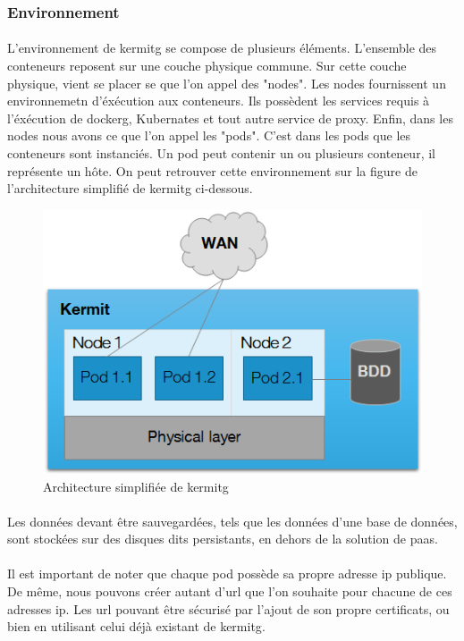 \documentclass[12pt,a4paper]{report}
\begin{document}
\subsubsection{Environnement}
\paragraph*{}L'environnement de \gls{kermitg} se compose de plusieurs éléments. L'ensemble des conteneurs reposent sur une couche physique commune. Sur cette couche physique, vient se placer se que l'on appel des "nodes". Les nodes fournissent un environnemetn d'éxécution aux conteneurs. Ils possèdent les services requis à l'éxécution de \gls{dockerg}, Kubernates et tout autre service de proxy. Enfin, dans les nodes nous avons ce que l'on appel les "pods". C'est dans les pods que les conteneurs sont instanciés. Un pod peut contenir un ou plusieurs conteneur, il représente un hôte. On peut retrouver cette environnement sur la figure de l'architecture simplifié de \gls{kermitg} ci-dessous. 
\begin{figure}[!ht]
    \center
    \includegraphics[scale=0.86]{./img/archi_kermit.png}
    \caption{Architecture simplifiée de \gls{kermitg}}
\end{figure}
\paragraph*{}Les données devant être sauvegardées, tels que les données d'une base de données, sont stockées sur des disques dits persistants, en dehors de la solution de \gls{paas}.
\paragraph*{}Il est important de noter que chaque pod possède sa propre adresse \gls{ip} publique. De même, nous pouvons créer autant d'\gls{url} que l'on souhaite pour chacune de ces adresses \gls{ip}. Les \gls{url} pouvant être sécurisé par l'ajout de son propre certificats, ou bien en utilisant celui déjà existant de \gls{kermitg}. \\
\end{document}
